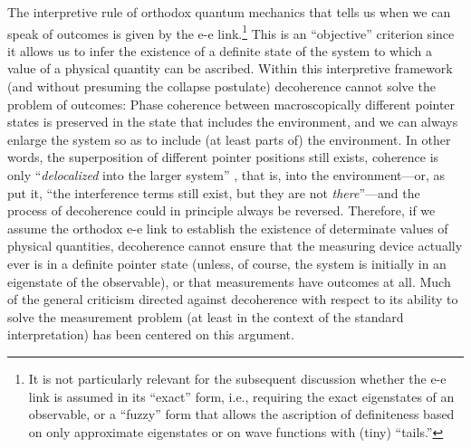 \documentclass[rmp,aps,amsmath,amsfonts,noshowkeys,noshowpacs,12pt]{revtex4}
\begin{document}
The interpretive rule of orthodox quantum mechanics that tells us when
we can speak of outcomes is given by the {e-e} link.\footnote{It is
  not particularly relevant for the subsequent discussion whether the
  {e-e} link is assumed in its ``exact'' form, i.e., requiring the
  exact eigenstates of an observable, or a ``fuzzy'' form that allows
  the ascription of definiteness based on only approximate eigenstates
  or on wave functions with (tiny) ``tails.''}  This is an
``objective'' criterion since it allows us to infer the existence of a
definite state of the system to which a value of a physical quantity
can be ascribed. Within this interpretive framework (and without
presuming the collapse postulate) decoherence cannot solve the problem
of outcomes: Phase coherence between macroscopically different pointer
states is preserved in the state that includes the environment, and we
can always enlarge the system so as to include (at least parts of) the
environment. In other words, the superposition of different pointer
positions still exists, coherence is only ``\emph{delocalized} into
the larger system'' \citep[p.~5]{Kiefer:1998:rz}, that is, into the
environment---or, as \citet[p.~224]{Joos:1985:iu} put it, ``the
interference terms still exist, but they are not \emph{there}''---and
the process of decoherence could in principle always be reversed.
Therefore, if we assume the orthodox {e-e} link to establish the
existence of determinate values of physical quantities, decoherence
cannot ensure that the measuring device actually ever is in a definite
pointer state (unless, of course, the system is initially in an
eigenstate of the observable), or that measurements have outcomes at
all. Much of the general criticism directed against decoherence with
respect to its ability to solve the measurement problem (at least in
the context of the standard interpretation) has been centered on this
argument.
\end{document}
